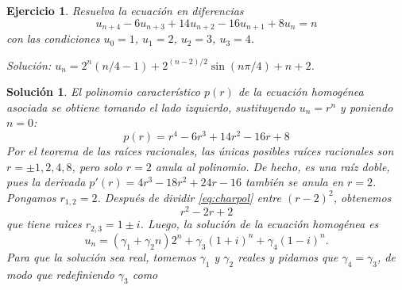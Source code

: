 \documentclass[11pt]{article}
\newtheorem{exercise}{Ejercicio}
\newtheorem*{sol}{Solución}
\begin{document}
\begin{exercise}
  Resuelva la ecuación en diferencias
  \begin{equation}
    u_{n+4} - 6u_{n+3} + 14u_{n+2} - 16 u_{n+1} + 8u_{n} = n
  \end{equation}
  con las condiciones $u_0=1$, $u_1=2$, $u_2=3$, $u_3=4$.

  \emph{Solución: $u_n=2^n(n / 4 -1) + 2^{(n-2) / 2}\sin(n\pi /
  4)+n+2$}.
\end{exercise}
\begin{sol}
  El polinomio característico $p(r)$ de la ecuación homogénea asociada
  se obtiene tomando el lado izquierdo, sustituyendo $u_n=r^{n}$ y
  poniendo $n=0$:
  \begin{equation}\label{eq:charpol}
    p(r) = r^{4} - 6r^{3} + 14r^{2} - 16 r + 8 
  \end{equation}
  Por el teorema de las raíces racionales, las únicas posibles raíces
  racionales son $r=\pm 1, 2, 4, 8$, pero solo $r=2$ anula al
  polinomio. De hecho, es una raíz doble, pues la derivada
  $p'(r)=4r^{3}-18r^{2}+24r-16$ también se anula en $r=2$.
  Pongamos $r_{1,2}=2$.
  Después de dividir \eqref{eq:charpol} entre $(r-2)^{2}$, obtenemos
  \begin{equation}
    r^{2}-2r+2
  \end{equation}
  que tiene raìces $r_{2,3}=1\pm i$.
  Luego, la solución de la ecuación homogénea es
  \begin{equation}
    u_n
    = (\gamma_1 + \gamma_2 n) 2^{n}
    + \gamma_3(1+i)^{n}
    + \gamma_4(1-i)^{n}
  .\end{equation}
  Para que la solución sea real, tomemos $\gamma_1$ y $\gamma_2$
  reales y pidamos que $\gamma_4=\gamma_3$, de
  modo que redefiniendo $\gamma_3$ como 
\end{sol}
\end{document}
